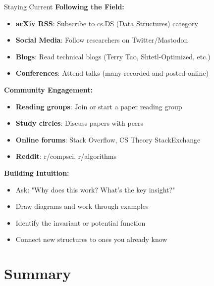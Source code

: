 \documentclass[aspectratio=169,xcolor=dvipsnames]{beamer}
\begin{document}
\begin{frame}{Staying Current}
  \textbf{Following the Field:}
  \begin{itemize}
    \item \textbf{arXiv RSS}: Subscribe to cs.DS (Data Structures) category
    \item \textbf{Social Media}: Follow researchers on Twitter/Mastodon
    \item \textbf{Blogs}: Read technical blogs (Terry Tao, Shtetl-Optimized, etc.)
    \item \textbf{Conferences}: Attend talks (many recorded and posted online)
  \end{itemize}

  \vspace{0.3cm}
  \textbf{Community Engagement:}
  \begin{itemize}
    \item \textbf{Reading groups}: Join or start a paper reading group
    \item \textbf{Study circles}: Discuss papers with peers
    \item \textbf{Online forums}: Stack Overflow, CS Theory StackExchange
    \item \textbf{Reddit}: r/compsci, r/algorithms
  \end{itemize}

  \vspace{0.3cm}
  \textbf{Building Intuition:}
  \begin{itemize}
    \item Ask: "Why does this work? What's the key insight?"
    \item Draw diagrams and work through examples
    \item Identify the invariant or potential function
    \item Connect new structures to ones you already know
  \end{itemize}
\end{frame}

\section{Summary}
\end{document}
